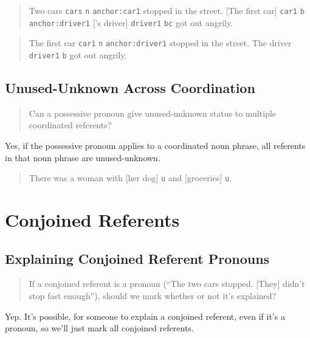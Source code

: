 \documentclass[
]{book}
\begin{document}
\begin{quote}
Two cars \texttt{cars} \texttt{n} \texttt{anchor:car1} stopped in the street.
{[}The first car{]} \texttt{car1} \texttt{b} \texttt{anchor:driver1}
{[}'s driver{]} \texttt{driver1} \texttt{bc} got out angrily.
\end{quote}

\begin{quote}
The first car \texttt{car1} \texttt{n} \texttt{anchor:driver1} stopped in the street.
The driver \texttt{driver1} \texttt{b} got out angrily.
\end{quote}

\hypertarget{unused-unknown-across-coordination}{%
\subsection{Unused-Unknown Across Coordination}\label{unused-unknown-across-coordination}}

\begin{quote}
Can a possessive pronoun give unused-unknown status to multiple coordinated referents?
\end{quote}

Yes,
if the possessive pronoun applies to a coordinated noun phrase,
all referents in that noun phrase are unused-unknown.

\begin{quote}
There was a woman with {[}her dog{]} \texttt{u} and {[}groceries{]} \texttt{u}.
\end{quote}

\hypertarget{conjoined-referents}{%
\section{Conjoined Referents}\label{conjoined-referents}}

\hypertarget{explaining-conjoined-referent-pronouns}{%
\subsection{Explaining Conjoined Referent Pronouns}\label{explaining-conjoined-referent-pronouns}}

\begin{quote}
If a conjoined referent is a pronoun
(``The two cars stopped. {[}They{]} didn't stop fast enough''),
should we mark whether or not it's explained?
\end{quote}

Yep.
It's possible, for someone to explain a conjoined referent, even if it's a pronoun, so we'll just mark all conjoined referents.
\end{document}
